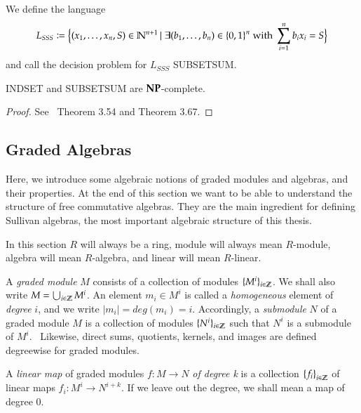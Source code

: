 \begin{Problem}
 We define the language
 $$ L_{SSS} \coloneqq {\big{\lbrace} (x_1, \ldots, x_n, S) \in \mathbb{N}^{n+1} \, | \;
 \exists (b_1, \ldots, b_n) \in {\lbrace 0,1 \rbrace}^n  \; \text{with} \; \sum_{i = 1}^n b_i x_i = S \big{\rbrace}} $$
 and call the decision problem for $L_{SSS}$ SUBSETSUM.
\end{Problem}



\begin{Theorem}
 INDSET and SUBSETSUM are $\mathbf{NP}$-complete.
\end{Theorem}

\begin{proof}
 See~\cite{JorgRothe2008} Theorem 3.54 and Theorem 3.67.
\end{proof}

 
 
\subsection{Graded Algebras}

Here, we introduce some algebraic notions of graded modules and algebras, and their properties. At the end of 
this section we want to be able to understand the structure of free commutative algebras. They are the main ingredient 
for defining Sullivan algebras, the most important algebraic structure of this thesis.

In this section $R$ will always be a ring, module will
always mean $R$-module, algebra will mean $R$-algebra, and linear will mean $R$-linear.


\begin{Definition}

A \emph{graded module} $M$ consists of a collection of modules $ {\lbrace M^i \rbrace}_{i \in \mathbb{Z}}$. We shall also write
$M = \bigcup_{i \in \mathbb{Z}} M^i$. An element 
$m_i \in M^i$ is called a \emph{homogeneous} element of \emph{degree} $i$, and we write $|m_i| = deg (m_i) = i$. 
Accordingly, a \emph{submodule} $N$ of
a graded module $M$ is a collection of modules ${\lbrace N^i \rbrace}_{i \in \mathbb{Z}}$ such that $N^i$ is a submodule of $M^i$. \
Likewise, direct sums, quotients, kernels, and images are defined degreewise for graded modules. 

A \emph{linear map}  of graded modules  $f \colon M \to N$ \emph{of degree k} is a collection 
${\lbrace f_i \rbrace}_{i \in \mathbb{Z}}$ of
linear maps $f_i \colon M^i \to N^{i + k}$. If we leave out the degree, we shall mean a map of degree $0$.
\end{Definition}

